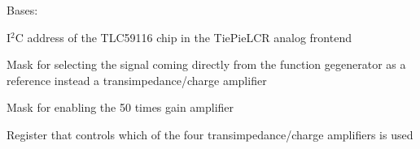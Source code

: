 \documentclass[letterpaper,10pt,english]{sphinxmanual}
\begin{document}
\begin{fulllineitems}
\label{\detokenize{index:TiePieLCR.TiePieLCR}}
\sphinxAtStartPar
Bases: 

\begin{fulllineitems}
\label{\detokenize{index:TiePieLCR.TiePieLCR.I2C_ADDRESS}}
\sphinxAtStartPar
I$^{\text{2}}$C address of the TLC59116 chip in the TiePieLCR analog frontend

\end{fulllineitems}


\begin{fulllineitems}
\label{\detokenize{index:TiePieLCR.TiePieLCR.I2C_CARSELECT}}
\sphinxAtStartPar
Mask for selecting the signal coming directly from the function gegenerator as a reference instead a transimpedance/charge amplifier

\end{fulllineitems}


\begin{fulllineitems}
\label{\detokenize{index:TiePieLCR.TiePieLCR.I2C_GAIN}}
\sphinxAtStartPar
Mask for enabling the 50 times gain amplifier

\end{fulllineitems}


\begin{fulllineitems}
\label{\detokenize{index:TiePieLCR.TiePieLCR.I2C_LEDOUT0}}
\sphinxAtStartPar
Register that controls which of the four transimpedance/charge amplifiers is used


\end{fulllineitems}
\end{fulllineitems}
\end{document}

